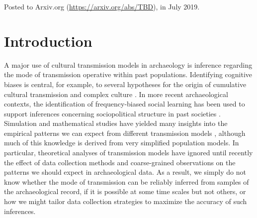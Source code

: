 \begin{description}[leftmargin=-1\labelwidth]
\item[\textsc{Abstract}] \lipsum[1] 

\item[\textsc{Source}]  Posted to Arxiv.org (\url{https://arxiv.org/abs/TBD}), in July 2019.  
\end{description}


\section{Introduction}\label{introduction}

A major use of cultural transmission models in archaeology is inference
regarding the mode of transmission operative within past populations.
Identifying cognitive biases is central, for example, to several
hypotheses for the origin of cumulative cultural transmission and
complex culture \cite{BR1985, CF1981, Henrich:1998ek, Wakano:2007gq}.
In more recent archaeological contexts, the identification of
frequency-biased social learning has been used to support
inferences concerning sociopolitical structure 
in past societies \cite{Kohler2004}.  Simulation and mathematical
studies have yielded many insights into the empirical patterns we can expect from different transmission models
\cite{Bentley2003, bentley2007regular, bentley2004random, Evans:2011vm, Mesoudi2009},
although much of this knowledge is derived from very simplified
population models.  In particular, theoretical analyses of transmission models  have ignored until recently the effect of data collection methods and coarse-grained observations on the patterns we should expect in archaeological data.  As a result, we simply do not know whether the mode of transmission can be reliably inferred from samples of the archaeological record, if it is possible at some time scales but not others, or how we might tailor data collection strategies to maximize the accuracy of such inferences.


